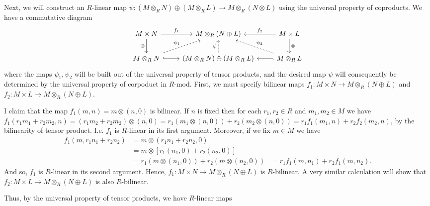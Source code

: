 \documentclass[12pt,letterpaper,boxed]{hmcpset}
\begin{document}
\begin{solution}
\begin{itemize}
Next, we will construct an $R$-linear map $\psi: (M \otimes_R N)
\oplus (M \otimes_R L) \to M \otimes_R (N \otimes L)$ using the
universal property of coproducts. We have a commutative diagram
\[
\begin{tikzcd}
M \times N \arrow[d, "\otimes"'] \arrow[r, "f_1"]          & M \otimes_R (N \oplus L)                                         & M \times L \arrow[d, "\otimes"] \arrow[l, "f_2"']           \\
M \otimes_R N \arrow[r, hook] \arrow[ru, "\psi_1", dashed] & (M \otimes_R N) \oplus (M \otimes_R L) \arrow[u, "\psi", dashed] & M \otimes_R L \arrow[l, hook] \arrow[lu, "\psi_2"', dashed]
\end{tikzcd}
\]
where the maps $\psi_1, \psi_2$ will be built out of the universal
property of tensor products, and the desired map $\psi$ will
consequently be determined by the universal property of corpoduct in
$R$-mod. First, we must specify bilinear maps $f_1: M\times N \to
M\otimes_R (N \oplus L)$ and $f_2: M \times L \to M \otimes_R (N
\oplus L)$. 

I claim that the map $f_1(m, n) = m \otimes (n, 0)$ is bilinear.
If $n$ is fixed then for each $r_1, r_2 \in R$ and $m_1, m_2 \in M$ we
have 
$f_1(r_1m_1 + r_2m_2, n) = (r_1 m_2 + r_2 m_2)
\otimes (n, 0) = r_1(m_1 \otimes (n,0)) + r_2 (m_2 \otimes (n,0)) =
r_1f_1(m_1, n) + r_2f_2(m_2, n)$,
by the bilinearity of tensor product. I.e. $f_1$ is $R$-linear in its
first argument.
Moreover, if we fix $m \in M$ we have 
\begin{align*}
f_1(m, r_1 n_1 + r_2 n_2) &= m \otimes (r_1n_1 + r_2 n_2, 0) \\
	&= m \otimes [r_1(n_1, 0) + r_2(n_2, 0)] \\
	&= r_1(m \otimes (n_1, 0)) + r_2(m \otimes (n_2, 0)) 
	&= r_1f_1(m, n_1) + r_2f_1(m, n_2).
\end{align*}
And so, $f_1$ is $R$-linear in its second argument.
Hence, $f_1: M \times N \to M \otimes_R (N \oplus L)$ is $R$-bilinear.
A very similar calculation will show that $f_2: M \times L \to M
\otimes_R (N \oplus L)$ is also $R$-bilinear.

Thus, by the universal property of tensor products, we have $R$-linear
maps 








\end{itemize}
\end{solution}

\newpage
\end{document}
